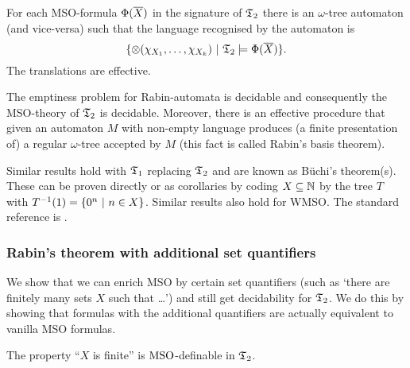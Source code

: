 \begin{theorem}
For each MSO-formula $\Phi(\mbox{$\overline {X}$})$ in the signature of $\mathfrak{T}_2$ there is an $\omega$-tree automaton (and vice-versa) such that the language recognised by the automaton is
\[
\{\otimes(\chi_{X_1},\dots,\chi_{X_k}) \ \vert \  \mathfrak{T}_2 \models \Phi(\mbox{$\overline {X}$})\}.
\]
The translations are effective.
\end{theorem}

\begin{proposition} \cite{Thom90}
The emptiness problem for Rabin-automata is decidable and consequently the MSO-theory of $\mathfrak{T}_2$ is decidable.
Moreover, there is an effective procedure that given an automaton $M$ with non-empty language produces (a finite presentation of) a 
regular $\omega$-tree accepted by $M$ (this fact is called Rabin's basis theorem).
\end{proposition}

Similar results hold with $\mathfrak{T}_1$ replacing $\mathfrak{T}_2$ and are known as B\"uchi's theorem(s). 
These can be proven directly  or as corollaries by coding $X \subseteq \mathbb{N}$ by the tree $T$ with $T^{-1}(1) = \{0^n \ \vert \  n \in X\}$.
Similar results also hold for WMSO. The standard reference is \cite{Thom90}.

\subsubsection*{Rabin's theorem with additional set quantifiers} \label{AS:sec:beyond}


We show that we can enrich MSO by certain set quantifiers (such as `there are finitely many sets $X$ such that \dots')
and still get decidability  for $\mathfrak{T}_2$. We do this by showing that formulas with the additional quantifiers are actually equivalent to vanilla MSO formulas. 

\begin{lemma} \label{AS:lem:msofindef}
The property ``$X$ is finite'' is $\mbox{\rm MSO}$-definable in $\mathfrak{T}_2$.
\end{lemma}

